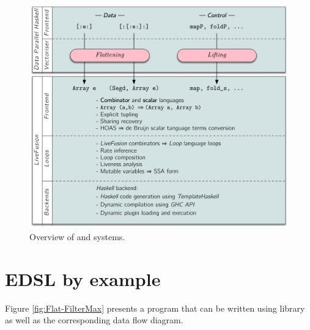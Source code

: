 \documentclass[preamble.tex]{subfiles}
\begin{document}
\begin{figure}
  \includegraphics[width=\textwidth]{img/Overview.pdf}
  \caption{Overview of \DPH and \LiveFusion systems.}
  \label{fig:Overview}
\end{figure}



\section{\LiveFusion EDSL by example}

Figure \ref{fig:Flat-FilterMax} presents a program that can be written using \LiveFusion library as well as the corresponding data flow diagram.
\end{document}
